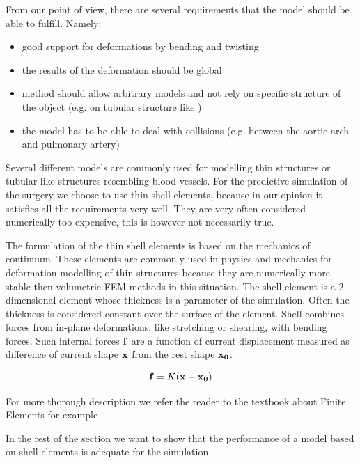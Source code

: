 From our point of view, there are several requirements that the model
should be able to fulfill. Namely:

\begin{itemize}
  \item good support for deformations by bending and twisting
  \item the results of the deformation should be global
  \item method should allow arbitrary models and not rely on specific
  structure of the object (e.g. on tubular structure like \cite{Li2009})
  \item the model has to be able to deal with collisions (e.g. between the
  aortic arch and pulmonary artery)
\end{itemize}

Several different models are commonly used for modelling thin structures or
tubular-like structures resembling blood vessels.  For the predictive simulation of the surgery we choose to use
thin shell elements, because in our opinion it satisfies all the
requirements very well. They are very often considered numerically too
expensive, this is however not necessarily true.


The formulation of the thin shell elements is based on the mechanics of
continuum. These elements are commonly used in physics and mechanics for
deformation modelling of thin structures because they are numerically more
stable then volumetric FEM methods in this situation. The shell element is
a 2-dimensional element whose thickness is a parameter of the simulation.
Often the thickness is considered constant over the surface of the element.
Shell combines forces from in-plane deformations, like stretching or
shearing, with bending forces. Such internal forces $\mathbf{f}$ are a
function of current displacement measured as difference of current shape
$\mathbf{x}$ from the rest shape $\mathbf{x_0}$.

\begin{equation}
  \mathbf{f} = K(\mathbf{x} - \mathbf{x_0})
\end{equation}

For more thorough description we refer the reader to the textbook about
Finite Elements for example .

In the rest of the section we want to show that the performance of a model
based on shell elements is adequate for the simulation.

